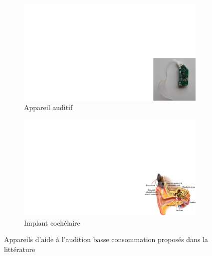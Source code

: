 \begin{table}[!htbp]
	\begin{minipage}[c]{0.5\textwidth}
		\begin{figure}[H]
			\begin{center}
				\begin{subfigure}[t]{0.45\textwidth}
					\captionsetup{justification=centering}
					\includegraphics[trim={25.5cm 0cm 0cm 10.7cm},clip,width=\textwidth]{../Chap1/Figure/hearing_aid_Scherer2019.pdf}
					\caption{Appareil auditif \cite{Scherer2019}}
					\label{fig:hearing_aid_Resound}
				\end{subfigure}
				\hfillx
				\begin{subfigure}[t]{0.55\textwidth}
					\captionsetup{justification=centering}
					\includegraphics[trim={23.7cm 0cm 0cm 10.5cm},clip,width=\textwidth]{../Chap1/Figure/implant_cochleaire_Yip2015.pdf}
					\caption{Implant cochélaire \cite{Yip2015}}
					\label{fig:implant_Cochlear}
				\end{subfigure}
				\caption{Appareils d'aide à l'audition basse consommation proposés dans la littérature}

\end{center}
\end{figure}
\end{minipage}
\end{table}

